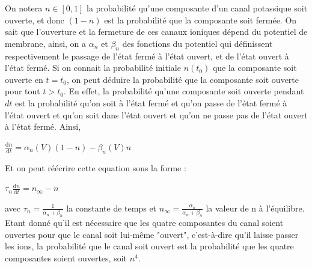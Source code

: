 \documentclass[12pt]{scrartcl}
\newcommand{\dd}{\mathrm{d}}
\begin{document}
On notera $n \in [0, 1]$ la probabilité qu'une composante d'un canal potassique soit ouverte, et donc $(1-n)$ est la probabilité que la composante soit fermée. On sait que l'ouverture et la fermeture de ces canaux ioniques dépend du potentiel de membrane, ainsi, on a $\alpha_n$ et $\beta_n$ des fonctions du potentiel qui définissent respectivement le passage de l'état fermé à l'état ouvert, et de l'état ouvert à l'état fermé. Si on connait la probabilité initiale $n(t_0)$ que la composante soit ouverte en $t=t_0$, on peut déduire la probabilité que la composante soit ouverte pour tout $t>t_0$. En effet, la probabilité qu'une composante soit ouverte pendant $dt$ est la probabilité qu'on soit à l'état fermé et qu'on passe de l'état fermé à l'état ouvert et qu'on soit dans l'état ouvert et qu'on ne passe pas de l'état ouvert à l'état fermé. Ainsi, 
\begin{center} $\displaystyle \frac{\dd n}{\dd t} = \alpha_n(V)(1-n) - \beta_n(V) n$ \end{center}
Et on peut réécrire cette equation sous la forme :
\begin{center} $\displaystyle \tau_n \frac{\dd n}{\dd t} = n_{\infty} - n$ \end{center}
avec $\tau_n = \frac{1}{\alpha_n+\beta_n}$ la constante de temps et $n_\infty = \frac{\alpha_n}{\alpha_n+\beta_n}$ la valeur de n à l'équilibre. \\
Etant donné qu'il est nécessaire que les quatre composantes du canal soient ouvertes pour que le canal soit lui-même "ouvert", c'est-à-dire qu'il laisse passer les ions, la probabilité que le canal soit ouvert est la probabilité que les quatre composantes soient ouvertes, soit $n^4$.
\end{document}
